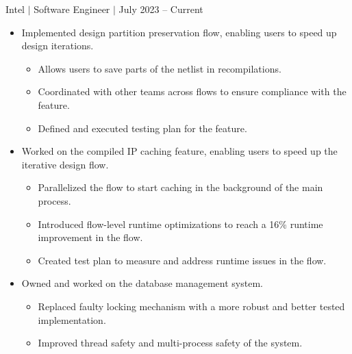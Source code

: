 \documentclass[12pt]{article}
\newcommand{\textDate}[3]{\noindent#1 $|$ #2 $|$ {\color{textGray} #3}}
\begin{document}
    \textDate{Intel}{Software Engineer}{July 2023 -- Current}
    \begin{small}
        \begin{itemize}
            \itemsep0em 

            \item {\color{textGray} Implemented design partition preservation flow, enabling users to speed up design iterations.}
                \begin{itemize}[label=$\circ$,topsep=-5px,partopsep=0px]
                    \itemsep0em 
                    \item {\color{textGray} Allows users to save parts of the netlist in recompilations.}
                    \item {\color{textGray} Coordinated with other teams across flows to ensure compliance with the feature.}
                    \item {\color{textGray} Defined and executed testing plan for the feature.}
                \end{itemize}

            \item {\color{textGray} Worked on the compiled IP caching feature, enabling users to speed up the iterative design flow.}
                \begin{itemize}[label=$\circ$,topsep=-5px,partopsep=0px]
                    \itemsep0em 
                    \item {\color{textGray} Parallelized the flow to start caching in the background of the main process.}
                    \item {\color{textGray} Introduced flow-level runtime optimizations to reach a 16\% runtime improvement in the flow.}
                    \item {\color{textGray} Created test plan to measure and address runtime issues in the flow.}
                \end{itemize}

            \item {\color{textGray} Owned and worked on the database management system.}
                \begin{itemize}[label=$\circ$,topsep=-5px,partopsep=0px]
                    \itemsep0em 
                    \item {\color{textGray} Replaced faulty locking mechanism with a more robust and better tested implementation.}
                    \item {\color{textGray} Improved thread safety and multi-process safety of the system.}
                \end{itemize}


\end{itemize}
\end{small}
\end{document}
